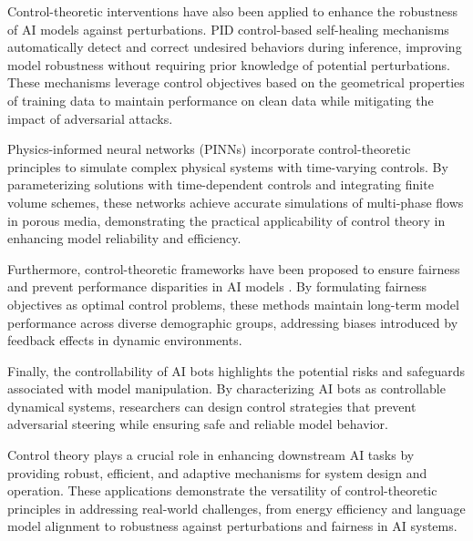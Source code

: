 \documentclass{article}
\theoremstyle{plain}
\theoremstyle{definition}
\theoremstyle{remark}
\begin{document}
Control-theoretic interventions have also been applied to enhance the robustness of AI models against perturbations. PID control-based self-healing mechanisms \cite{chenPIDControlbasedSelfhealing2024, chenSelfhealingRobustNeural2022} automatically detect and correct undesired behaviors during inference, improving model robustness without requiring prior knowledge of potential perturbations. These mechanisms leverage control objectives based on the geometrical properties of training data to maintain performance on clean data while mitigating the impact of adversarial attacks.

Physics-informed neural networks (PINNs) \cite{chenTransferLearningbasedPhysicsinformed2023} incorporate control-theoretic principles to simulate complex physical systems with time-varying controls. By parameterizing solutions with time-dependent controls and integrating finite volume schemes, these networks achieve accurate simulations of multi-phase flows in porous media, demonstrating the practical applicability of control theory in enhancing model reliability and efficiency.

Furthermore, control-theoretic frameworks have been proposed to ensure fairness and prevent performance disparities in AI models \cite{chenAsymptoticallyFairParticipation2023}. By formulating fairness objectives as optimal control problems, these methods maintain long-term model performance across diverse demographic groups, addressing biases introduced by feedback effects in dynamic environments.

Finally, the controllability of AI bots \cite{soattoTamingAIBots2023} highlights the potential risks and safeguards associated with model manipulation. By characterizing AI bots as controllable dynamical systems, researchers can design control strategies that prevent adversarial steering while ensuring safe and reliable model behavior.

Control theory plays a crucial role in enhancing downstream AI tasks by providing robust, efficient, and adaptive mechanisms for system design and operation. These applications demonstrate the versatility of control-theoretic principles in addressing real-world challenges, from energy efficiency and language model alignment to robustness against perturbations and fairness in AI systems.



\end{document}

